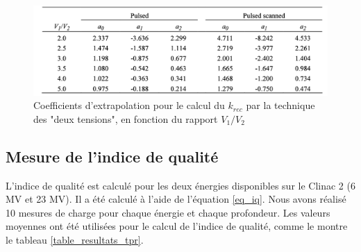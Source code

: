 \documentclass{article}
\begin{document}
\begin{figure}[h!]
  \centering
  \includegraphics[scale=0.5]{figures/coeff_krec.png}
  \caption{Coefficients d'extrapolation pour le calcul du $k_{rec}$ par la technique des "deux tensions", en fonction du rapport $V_1/V_2$}
  \label{fig_krec}
\end{figure}

\newpage
\subsection{Mesure de l'indice de qualité}

L'indice de qualité est calculé pour les deux énergies disponibles sur le Clinac 2 (6 MV et 23 MV). Il a été calculé à l'aide de l'équation \ref*{eq_iq}. Nous avons réalisé 10 mesures de charge pour chaque énergie et chaque profondeur. Les valeurs moyennes ont été utilisées pour le calcul de l'indice de qualité, comme le montre le tableau \ref*{table_resultats_tpr}.
\end{document}
